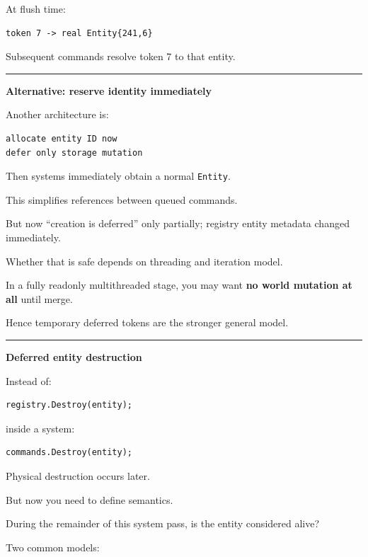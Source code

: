 At flush time:

\begin{verbatim}
token 7 -> real Entity{241,6}
\end{verbatim}

Subsequent commands resolve token 7 to that entity.

\begin{center}\rule{0.5\linewidth}{0.5pt}\end{center}

\textbf{Alternative: reserve identity immediately}

Another architecture is:

\begin{verbatim}
allocate entity ID now
defer only storage mutation
\end{verbatim}

Then systems immediately obtain a normal \texttt{Entity}.

This simplifies references between queued commands.

But now ``creation is deferred'' only partially; registry entity metadata changed immediately.

Whether that is safe depends on threading and iteration model.

In a fully readonly multithreaded stage, you may want \textbf{no world mutation at all} until merge.

Hence temporary deferred tokens are the stronger general model.

\begin{center}\rule{0.5\linewidth}{0.5pt}\end{center}

\textbf{Deferred entity destruction}

Instead of:

\begin{verbatim}
registry.Destroy(entity);
\end{verbatim}

inside a system:

\begin{verbatim}
commands.Destroy(entity);
\end{verbatim}

Physical destruction occurs later.

But now you need to define semantics.

During the remainder of this system pass, is the entity considered alive?

Two common models:

